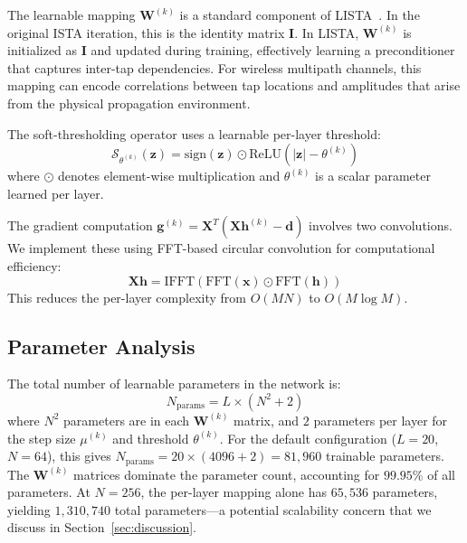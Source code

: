 \documentclass[a4paper,fleqn]{cas-sc}
\begin{document}
The learnable mapping $\mathbf{W}^{(k)}$ is a standard component of LISTA~\citep{gregor2010learning}. In the original ISTA iteration, this is the identity matrix $\mathbf{I}$. In LISTA, $\mathbf{W}^{(k)}$ is initialized as $\mathbf{I}$ and updated during training, effectively learning a preconditioner that captures inter-tap dependencies. For wireless multipath channels, this mapping can encode correlations between tap locations and amplitudes that arise from the physical propagation environment.

The soft-thresholding operator uses a learnable per-layer threshold:
\begin{equation}\label{eq:learned_threshold}
\mathcal{S}_{\theta^{(k)}}(\mathbf{z}) = \text{sign}(\mathbf{z}) \odot \text{ReLU}(|\mathbf{z}| - \theta^{(k)})
\end{equation}
where $\odot$ denotes element-wise multiplication and $\theta^{(k)}$ is a scalar parameter learned per layer.

The gradient computation $\mathbf{g}^{(k)} = \mathbf{X}^T(\mathbf{X}\mathbf{h}^{(k)} - \mathbf{d})$ involves two convolutions. We implement these using FFT-based circular convolution for computational efficiency:
\begin{equation}\label{eq:fft_conv}
\mathbf{X}\mathbf{h} = \text{IFFT}(\text{FFT}(\mathbf{x}) \odot \text{FFT}(\mathbf{h}))
\end{equation}
This reduces the per-layer complexity from $O(MN)$ to $O(M \log M)$.

\subsection{Parameter Analysis}

The total number of learnable parameters in the network is:
\begin{equation}
N_{\text{params}} = L \times (N^2 + 2)
\end{equation}
where $N^2$ parameters are in each $\mathbf{W}^{(k)}$ matrix, and $2$ parameters per layer for the step size $\mu^{(k)}$ and threshold $\theta^{(k)}$. For the default configuration ($L=20$, $N=64$), this gives $N_{\text{params}} = 20 \times (4096 + 2) = 81{,}960$ trainable parameters. The $\mathbf{W}^{(k)}$ matrices dominate the parameter count, accounting for $99.95\%$ of all parameters. At $N=256$, the per-layer mapping alone has $65{,}536$ parameters, yielding $1{,}310{,}740$ total parameters---a potential scalability concern that we discuss in Section~\ref{sec:discussion}.
\end{document}
